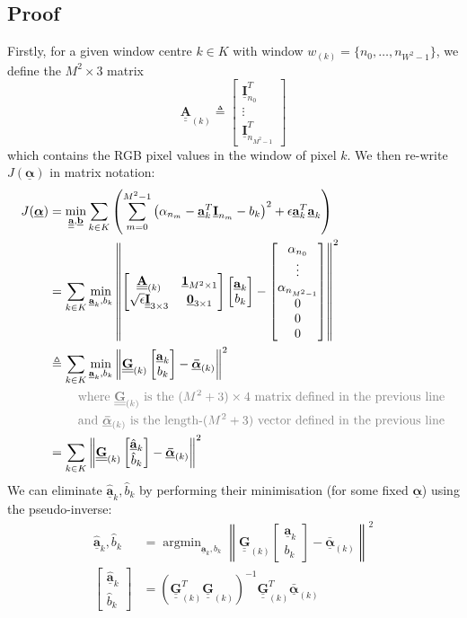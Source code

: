 \documentclass{article}
\newcommand{\bmat}[1]{\begin{bmatrix}#1\end{bmatrix}}
\theoremstyle{definition}
\newcommand{\textgrey}[1]{\textcolor{gray}{#1}}
\DeclareMathOperator*{\argmin}{argmin}
\def\vt#1{\underline{\mathbf{#1}}}
\def\vts#1{\underline{\boldsymbol{#1}}}
\def\mt#1{\underline{\underline{\mathbf{#1}}}}
\begin{document}
\subsection{Proof}
Firstly, for a given window centre $k\in K$ with window $w_{(k)}=\{n_0,\dots,n_{W^2-1}\}$, we define the $M^2\times 3$ matrix
$$\mt A_{(k)} \triangleq \bmat{\vt I_{n_0}^T \\ \vdots \\ \vt I_{n_{M^2-1}}^T}$$
which contains the RGB pixel values in the window of pixel $k$. We then re-write $J(\vts\alpha)$ in matrix notation:
\begin{align*}
    J(\vts\alpha) &= \min_{\mt a,\vt b} \sum_{k\in K} \left(\sum_{m=0}^{M^2-1} \left(\alpha_{n_m} - \vt a_k^T \vt I_{n_m} - b_k\right)^2 + \epsilon \vt a_k^T \vt a_k \right) \\
    &= \sum_{k\in K}  \min_{\vt a_k,b_k} \left\| \bmat{\mt A_{(k)} & \vt 1_{M^2\times 1} \\ \sqrt\epsilon \mt I_{3\times 3} & \vt 0_{3\times1}} \bmat{\vt a_k\\b_k} - \bmat{\alpha_{n_0} \\ \vdots \\ \alpha_{n_{M^2-1}} \\ 0 \\ 0 \\ 0} \right\|^2 \\
    &\triangleq \sum_{k\in K} \min_{\vt a_k,b_k} \left\| \mt G_{(k)} \bmat{\vt a_k\\b_k} - \vts{\bar{\alpha}}_{(k)} \right\|^2\\
    &\quad\quad\ \textgrey{\text{where $\mt G_{(k)}$ is the $(M^2+3) \times 4$ matrix defined in the previous line}}\\
    &\quad\quad\ \textgrey{\text{and $\vts{\bar{\alpha}}_{(k)}$ is the length-$(M^2+3)$ vector defined in the previous line}}\\
    &= \sum_{k\in K} \left\| \mt G_{(k)} \bmat{\hat{\vt a}_k\\\hat{b}_k} - \vts{\bar{\alpha}}_{(k)} \right\|^2
\end{align*}
We can eliminate $\hat{\vt{a}}_k,\hat{b}_k$ by performing their minimisation (for some fixed $\vts\alpha$) using the pseudo-inverse:
\begin{align*}
    \hat{\vt a}_k, \hat{b}_k &= \argmin_{\vt a_k,b_k} \left\| \mt G_{(k)} \bmat{\vt a_k\\b_k} - \vts{\bar{\alpha}}_{(k)} \right\|^2\\
    \bmat{\hat{\vt a}_k\\\hat{b}_k} &= \left(\mt G_{(k)}^T \mt G_{(k)} \right)^{-1} \mt G_{(k)}^T \vts{\bar{\alpha}}_{(k)}
\end{align*}
\end{document}
